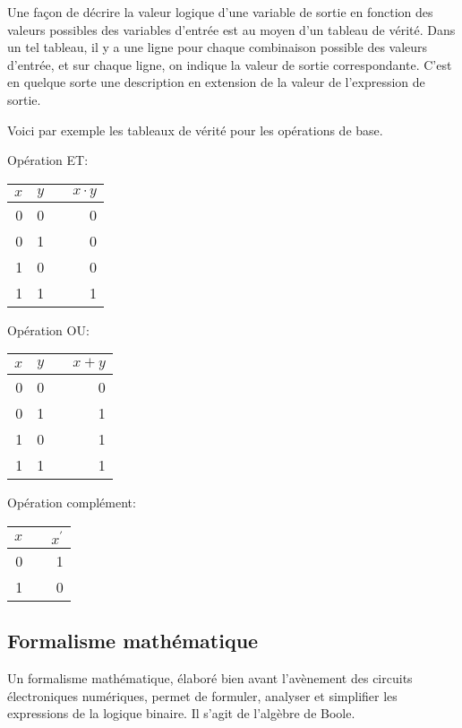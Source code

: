 \documentclass[11pt]{article}
\begin{document}
Une façon de décrire la valeur logique d'une variable de sortie en
fonction des valeurs possibles des variables d'entrée est au moyen
d'un tableau de vérité. Dans un tel tableau, il y a une ligne pour
chaque combinaison possible des valeurs d'entrée, et sur chaque ligne,
on indique la valeur de sortie correspondante. C'est en quelque sorte
une description en extension de la valeur de l'expression de sortie.

Voici par exemple les tableaux de vérité pour les opérations de base.

Opération ET:

\begin{center}
\begin{tabular}{rrlr}
\(x\) & \(y\) &  & \(x \cdot y\)\\
\hline
0 & 0 &  & 0\\
0 & 1 &  & 0\\
1 & 0 &  & 0\\
1 & 1 &  & 1\\
\end{tabular}
\end{center}

Opération OU:

\begin{center}
\begin{tabular}{rrlr}
\(x\) & \(y\) &  & \(x + y\)\\
\hline
0 & 0 &  & 0\\
0 & 1 &  & 1\\
1 & 0 &  & 1\\
1 & 1 &  & 1\\
\end{tabular}
\end{center}

Opération complément:

\begin{center}
\begin{tabular}{rlr}
\(x\) &  & \(x^{\prime}\)\\
\hline
0 &  & 1\\
1 &  & 0\\
\end{tabular}
\end{center}

\subsection{Formalisme mathématique}
\label{sec:org0a08ce4}

Un formalisme mathématique, élaboré bien avant l'avènement des
circuits électroniques numériques, permet de formuler, analyser et
simplifier les expressions de la logique binaire. Il s'agit de
l'algèbre de Boole. 
\end{document}
